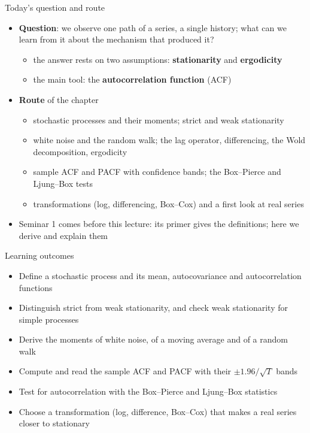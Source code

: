 \begin{frame}{Today's question and route}
\itemsize{\small}
\begin{itemize}
    \item \textbf{Question}: we observe one path of a series, a single history; what can we learn from it about the mechanism that produced it?
    \begin{itemize}
        \item the answer rests on two assumptions: \textbf{stationarity} and \textbf{ergodicity}
        \item the main tool: the \textbf{autocorrelation function} (ACF)
    \end{itemize}
    \item \textbf{Route} of the chapter
    \begin{itemize}
        \item stochastic processes and their moments; strict and weak stationarity
        \item white noise and the random walk; the lag operator, differencing, the Wold decomposition, ergodicity
        \item sample ACF and PACF with confidence bands; the Box--Pierce and Ljung--Box tests
        \item transformations (log, differencing, Box--Cox) and a first look at real series
    \end{itemize}
    \item Seminar 1 comes before this lecture: its primer gives the definitions; here we derive and explain them
\end{itemize}
\end{frame}

\begin{frame}{Learning outcomes}
\itemsize{\small}
\begin{itemize}
    \item Define a stochastic process and its mean, autocovariance and autocorrelation functions
    \item Distinguish strict from weak stationarity, and check weak stationarity for simple processes
    \item Derive the moments of white noise, of a moving average and of a random walk
    \item Compute and read the sample ACF and PACF with their $\pm 1.96/\sqrt{T}$ bands
    \item Test for autocorrelation with the Box--Pierce and Ljung--Box statistics
    \item Choose a transformation (log, difference, Box--Cox) that makes a real series closer to stationary
\end{itemize}
\end{frame}

